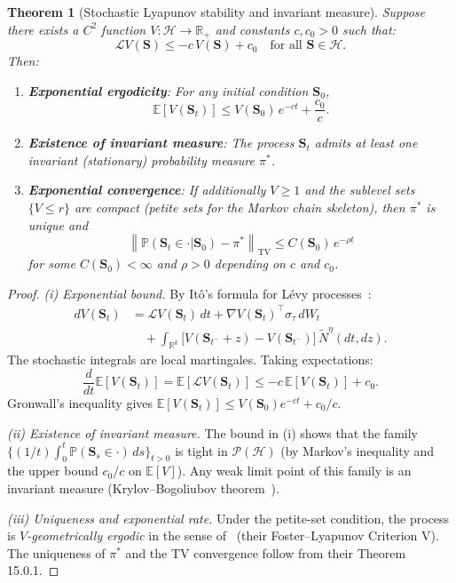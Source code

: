 \documentclass[12pt,a4paper]{article}
\theoremstyle{plain}
\newtheorem{theorem}{Theorem}[section]
\theoremstyle{definition}
\newcommand{\R}{\mathbb{R}}
\newcommand{\E}{\mathbb{E}}
\newcommand{\PP}{\mathbb{P}}
\newcommand{\Hil}{\mathcal{H}}
\newcommand{\Prob}{\mathcal{P}}
\newcommand{\1}{\mathbbm{1}}
\newcommand{\norm}[1]{\left\|#1\right\|}
\begin{document}
\begin{theorem}[Stochastic Lyapunov stability and invariant measure]
\label{thm:lyapunov}
Suppose there exists a $C^2$ function $V: \Hil \to \R_+$ and constants
$c, c_0 > 0$ such that:
\begin{equation}
\label{eq:lyapunov_cond}
\mathcal{L}V(\mathbf{S}) \leq -c\,V(\mathbf{S}) + c_0
\quad \text{for all } \mathbf{S} \in \Hil.
\end{equation}
Then:
\begin{enumerate}[label=(\roman*)]
\item \textbf{Exponential ergodicity}: For any initial condition $\mathbf{S}_0$,
\[
\E[V(\mathbf{S}_t)] \leq V(\mathbf{S}_0)\,e^{-ct} + \frac{c_0}{c}.
\]
\item \textbf{Existence of invariant measure}: The process $\mathbf{S}_t$ admits
at least one invariant (stationary) probability measure $\pi^*$.
\item \textbf{Exponential convergence}: If additionally $V \geq 1$ and the
sublevel sets $\{V \leq r\}$ are compact (petite sets for the Markov
chain skeleton), then $\pi^*$ is unique and
\[
\norm{\PP(\mathbf{S}_t \in \cdot|\mathbf{S}_0) - \pi^*}_{\mathrm{TV}}
\leq C(\mathbf{S}_0)\,e^{-\rho t}
\]
for some $C(\mathbf{S}_0) < \infty$ and $\rho > 0$ depending on $c$ and $c_0$.
\end{enumerate}
\end{theorem}

\begin{proof}
\textit{(i) Exponential bound.}
By Itô's formula for Lévy processes~\citep{Sato1999,Protter2005}:
\begin{align*}
dV(\mathbf{S}_t) &= \mathcal{L}V(\mathbf{S}_t)\,dt
 + \nabla V(\mathbf{S}_t)^\top\sigma_\tau\,dW_t \\
&\quad + \int_{\R^k}\!\bigl[V(\mathbf{S}_{t^-}+z) - V(\mathbf{S}_{t^-})\bigr]\,
         \tilde{N}^\eta(dt,dz).
\end{align*}
The stochastic integrals are local martingales. Taking expectations:
\[
\frac{d}{dt}\E[V(\mathbf{S}_t)]
= \E[\mathcal{L}V(\mathbf{S}_t)]
\leq -c\,\E[V(\mathbf{S}_t)] + c_0.
\]
Gronwall's inequality gives $\E[V(\mathbf{S}_t)] \leq V(\mathbf{S}_0)e^{-ct} + c_0/c$.

\textit{(ii) Existence of invariant measure.}
The bound in (i) shows that the family $\{(1/t)\int_0^t \PP(\mathbf{S}_s \in \cdot)\,ds\}_{t>0}$
is tight in $\Prob(\Hil)$ (by Markov's inequality and the upper bound
$c_0/c$ on $\E[V]$). Any weak limit point of this family is an invariant measure
(Krylov--Bogoliubov theorem~\citep{DaPratoZabczyk1996}).

\textit{(iii) Uniqueness and exponential rate.}
Under the petite-set condition, the process is \emph{$V$-geometrically ergodic}
in the sense of~\citet{MeynTweedie1993} (their Foster--Lyapunov
Criterion V). The uniqueness of $\pi^*$ and the TV convergence follow from
their Theorem 15.0.1.
\end{proof}
\end{document}
